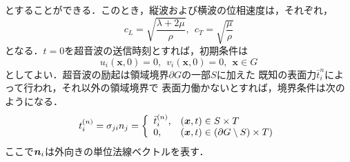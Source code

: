とすることができる．このとき，縦波および横波の位相速度は，それぞれ，
\begin{equation}
	c_{L}=\sqrt{\frac{\lambda + 2\mu}{\rho}}
	, \ \ 
	c_{T}=\sqrt{\frac{\mu}{\rho}}
	\label{eqn:}
\end{equation}
となる．$t=0$を超音波の送信時刻とすれば，初期条件は
\begin{equation}
	u_i(\boldsymbol{x},0)=0, \ \ v_i(\boldsymbol{x},0)=0, \ \ \boldsymbol{x} \in G
	\label{eqn:IC}
\end{equation}
としてよい．超音波の励起は領域境界$\partial G$の一部$S$に加えた
既知の表面力$\bar{t}_i^{n}$によって行われ，それ以外の領域境界で
表面力働かないとすれば，境界条件は次のようになる．
\begin{equation}
	t_i^{(n)} = \sigma_{ji}n_j=
	\left\{
		\begin{array}{ll}	
			\bar{t}^{(n)}_i, & (\boldsymbol{x},t)\in S\times T \\
			0,  & (\boldsymbol{x},t)\in (\partial G \setminus S)\times T) 
		\end{array}
	\right.
	\label{eqn:BC}
\end{equation}
ここで$\boldsymbol{n}_i$は外向きの単位法線ベクトルを表す．
